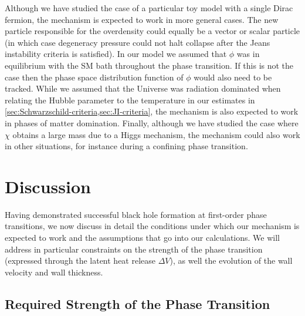 \documentclass[
onecolumn, %
11pt, %
tightenlines,
superscriptaddress, %
nofootinbib, %
preprintnumbers, %
prd %
]{revtex4-1}
\begin{document}
Although we have studied the case of a particular toy model with a single Dirac fermion, the mechanism is expected to work in more general cases.  The new particle responsible for the overdensity could equally be a vector or scalar particle (in which case degeneracy pressure could not halt collapse after the Jeans instability criteria is satisfied).  In our model we assumed that $\phi$ was in equilibrium with the SM bath throughout the phase transition.  If this is not the case then the phase space distribution function of $\phi$ would also need to be tracked.  While  we assumed that the Universe was radiation dominated when relating the Hubble parameter to the temperature in our estimates in \cref{sec:Schwarzschild-criteria,sec:JI-criteria}, the mechanism is also expected to work in phases of matter domination.  Finally, although we have studied the case where $\chi$ obtains a large mass due to a Higgs mechanism, the mechanism could also work in other situations, for instance during a confining phase transition.


\section{Discussion}
\label{sec:discussion}

Having demonstrated successful black hole formation at first-order phase transitions, we now discuss in detail the conditions under which our mechanism is expected to work and the assumptions that go into our calculations. We will address in particular constraints on the strength of the phase transition (expressed through the latent heat release $\Delta V$), as well the evolution of the wall velocity and wall thickness.


\subsection{Required Strength of the Phase Transition}
\label{sec:latent-heat}
\end{document}

